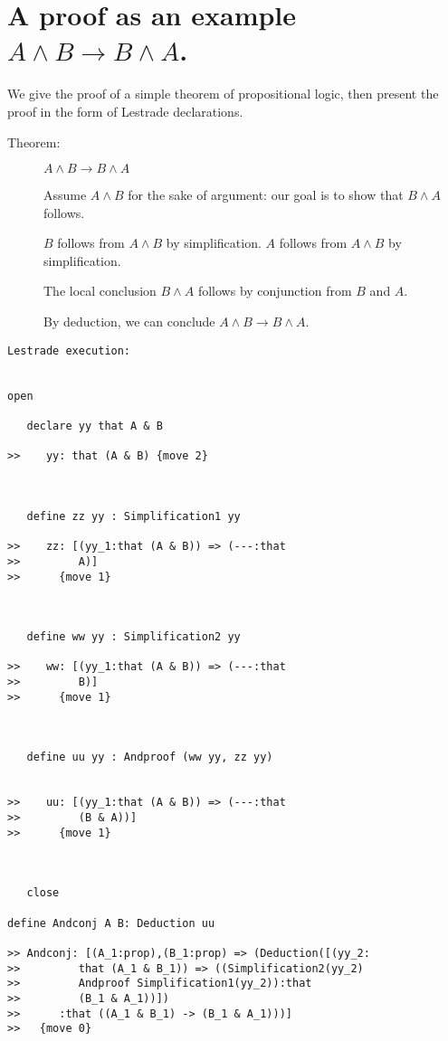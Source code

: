 \documentclass[12pt]{article}
\begin{document}
\section{A proof as an example $A \wedge B \rightarrow B \wedge A$.}

We give the proof of a simple theorem of propositional logic, then present the proof in the form of Lestrade declarations.

\begin{description}

\item[Theorem:]  $A \wedge B \rightarrow B \wedge A$

Assume $A \wedge B$ for the sake of argument:  our goal is to show that $B \wedge A$ follows.

$B$ follows from $A \wedge B$ by simplification.  $A$ follows from $A \wedge B$ by simplification.  

The local conclusion $B \wedge A$ follows by conjunction from $B$ and $A$.

By deduction, we can conclude $A \wedge B \rightarrow B \wedge A$.

\end{description}

\begin{verbatim}Lestrade execution:


open

   declare yy that A & B

>>    yy: that (A & B) {move 2}



   define zz yy : Simplification1 yy

>>    zz: [(yy_1:that (A & B)) => (---:that
>>         A)]
>>      {move 1}



   define ww yy : Simplification2 yy

>>    ww: [(yy_1:that (A & B)) => (---:that
>>         B)]
>>      {move 1}



   define uu yy : Andproof (ww yy, zz yy)


>>    uu: [(yy_1:that (A & B)) => (---:that
>>         (B & A))]
>>      {move 1}



   close

define Andconj A B: Deduction uu

>> Andconj: [(A_1:prop),(B_1:prop) => (Deduction([(yy_2:
>>         that (A_1 & B_1)) => ((Simplification2(yy_2)
>>         Andproof Simplification1(yy_2)):that
>>         (B_1 & A_1))])
>>      :that ((A_1 & B_1) -> (B_1 & A_1)))]
>>   {move 0}


\end{verbatim}
\end{document}
